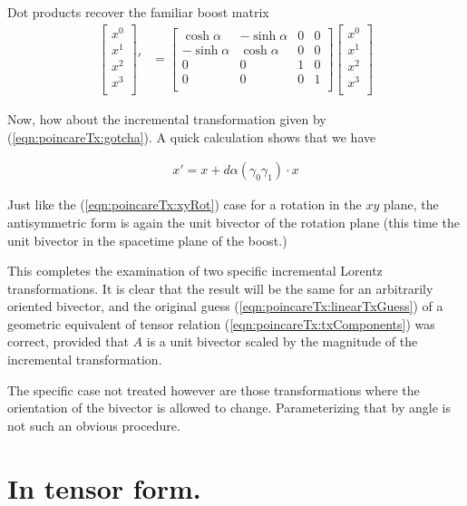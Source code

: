 Dot products recover the familiar boost matrix
\begin{align*}
\begin{bmatrix}
x^0 \\
x^1 \\
x^2 \\
x^3 \\
\end{bmatrix}'
&=
\begin{bmatrix}
\cosh\alpha & -\sinh\alpha & 0 & 0 \\
-\sinh\alpha & \cosh\alpha & 0 & 0 \\
0 & 0 & 1 & 0 \\
0 & 0 & 0 & 1 \\
\end{bmatrix}
\begin{bmatrix}
x^0 \\
x^1 \\
x^2 \\
x^3 \\
\end{bmatrix}
\end{align*}

Now, how about the incremental transformation given by (\ref{eqn:poincareTx:gotcha}).  A quick calculation shows that we have

\begin{align}\label{eqn:poincareTx:xLor}
x' = x + d\alpha (\gamma_0 \gamma_1) \cdot x
\end{align}

Just like the (\ref{eqn:poincareTx:xyRot}) case for a rotation in the $x y$ plane, the antisymmetric form is again the unit bivector of the rotation plane (this time the unit bivector in the spacetime plane of the boost.)

This completes the examination of two specific incremental Lorentz transformations.  It is clear that the result will be the same for an arbitrarily oriented bivector, and the original guess (\ref{eqn:poincareTx:linearTxGuess}) of a geometric equivalent of tensor relation (\ref{eqn:poincareTx:txComponents}) was correct, provided that $A$ is a unit bivector scaled by the magnitude of the incremental transformation.

The specific case not treated however are those transformations where the orientation of the bivector is allowed to change.  Parameterizing that by angle is not such an obvious procedure.

\section{In tensor form.}

